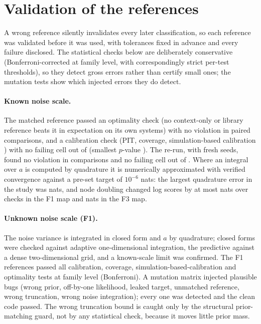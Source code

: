 \section{Validation of the references}\label{sec:val}
A wrong reference silently invalidates every later classification, so each reference was validated before it was used,
with tolerances fixed in advance and every failure disclosed. The statistical checks below are deliberately conservative
(Bonferroni-corrected at family level, with correspondingly strict per-test thresholds), so they detect gross errors rather
than certify small ones; the mutation tests show which injected errors they do detect.

\paragraph{Known noise scale.} The matched reference passed an optimality check (no context-only or library reference beats
it in expectation on its own systems) with no violation in \SzeroTone paired comparisons, and a calibration check (PIT,
coverage, simulation-based calibration \citep{talts2018}) with no failing cell out of \SzeroTtwoCells (smallest $p$-value
\SzeroTtwoMinP). The \sHalf re-run, with fresh seeds, found no violation in \SfiveToneComparisons comparisons and no failing
cell out of \SfiveTtwoCells. Where an integral over $a$ is computed by quadrature it is numerically approximated with
verified convergence against a pre-set target of $10^{-6}$ nats: the largest quadrature error in the \sHalf study was
\SfiveQuadErr nats, and node doubling changed log scores by at most \FoneMapNodeDoubling nats over \FoneMapChecks checks in
the F1 map and \FthreeNodeDoubling nats in the F3 map.

\paragraph{Unknown noise scale (F1).} The noise variance is integrated in closed form and $a$ by quadrature; closed forms were
checked against adaptive one-dimensional integration, the predictive against a dense two-dimensional grid, and a
known-scale limit was confirmed. The F1 references passed all \FoneValTests calibration, coverage,
simulation-based-calibration and optimality tests at family level \FamilyAlpha (Bonferroni). A mutation matrix injected
\FoneMutations plausible bugs (wrong prior, off-by-one likelihood, leaked target, unmatched reference, wrong truncation,
wrong noise integration); every one was detected and the clean code passed. The wrong truncation bound is caught only by
the structural prior-matching guard, not by any statistical check, because it moves little prior mass.

